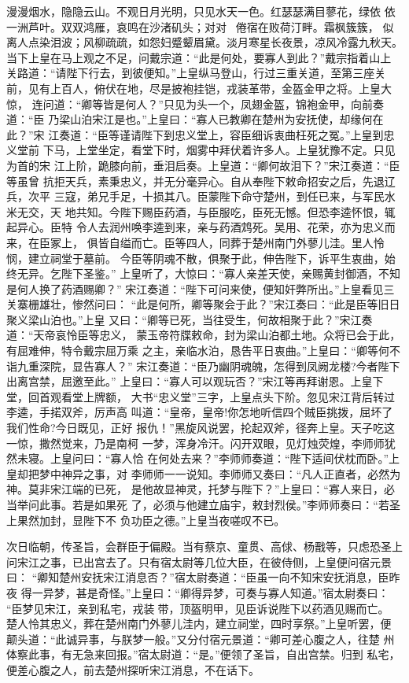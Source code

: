 漫漫烟水，隐隐云山。不观日月光明，只见水天一色。红瑟瑟满目蓼花，绿依
依一洲芦叶。双双鸿雁，哀鸣在沙渚矶头；对对，倦宿在败荷汀畔。霜枫簇簇，
似离人点染泪波；风柳疏疏，如怨妇蹙颦眉黛。淡月寒星长夜景，凉风冷露九秋天。
当下上皇在马上观之不足，问戴宗道：“此是何处，要寡人到此？”戴宗指着山上
关路道：“请陛下行去，到彼便知。”上皇纵马登山，行过三重关道，至第三座关
前，见有上百人，俯伏在地，尽是披袍挂铠，戎装革带，金盔金甲之将。上皇大惊，
连问道：“卿等皆是何人？”只见为头一个，凤翅金盔，锦袍金甲，向前奏道：“臣
乃梁山泊宋江是也。”上皇曰：“寡人已教卿在楚州为安抚使，却缘何在此？”宋
江奏道：“臣等谨请陛下到忠义堂上，容臣细诉衷曲枉死之冤。”上皇到忠义堂前
下马，上堂坐定，看堂下时，烟雾中拜伏着许多人。上皇犹豫不定。只见为首的宋
江上阶，跪膝向前，垂泪启奏。上皇道：“卿何故泪下？”宋江奏道：“臣等虽曾
抗拒天兵，素秉忠义，并无分毫异心。自从奉陛下敕命招安之后，先退辽兵，次平
三寇，弟兄手足，十损其八。臣蒙陛下命守楚州，到任已来，与军民水米无交，天
地共知。今陛下赐臣药酒，与臣服吃，臣死无憾。但恐李逵怀恨，辄起异心。臣特
令人去润州唤李逵到来，亲与药酒鸩死。吴用、花荣，亦为忠义而来，在臣冢上，
俱皆自缢而亡。臣等四人，同葬于楚州南门外蓼儿洼。里人怜悯，建立祠堂于墓前。
今臣等阴魂不散，俱聚于此，伸告陛下，诉平生衷曲，始终无异。乞陛下圣鉴。”
上皇听了，大惊曰：“寡人亲差天使，亲赐黄封御酒，不知是何人换了药酒赐卿？”
宋江奏道：“陛下可问来使，便知奸弊所出。”上皇看见三关寨栅雄壮，惨然问曰：
“此是何所，卿等聚会于此？”宋江奏曰：“此是臣等旧日聚义梁山泊也。”上皇
又曰：“卿等已死，当往受生，何故相聚于此？”宋江奏道：“天帝哀怜臣等忠义，
蒙玉帝符牒敕命，封为梁山泊都土地。众将已会于此，有屈难伸，特令戴宗屈万乘
之主，亲临水泊，恳告平日衷曲。”上皇曰：“卿等何不诣九重深院，显告寡人？”
宋江奏道：“臣乃幽阴魂魄，怎得到凤阙龙楼?今者陛下出离宫禁，屈邀至此。”
上皇曰：“寡人可以观玩否？”宋江等再拜谢恩。上皇下堂，回首观看堂上牌额，
大书“忠义堂”三字，上皇点头下阶。忽见宋江背后转过李逵，手掿双斧，厉声高
叫道：“皇帝，皇帝!你怎地听信四个贼臣挑拨，屈坏了我们性命?今日既见，正好
报仇！”黑旋风说罢，抡起双斧，径奔上皇。天子吃这一惊，撒然觉来，乃是南柯
一梦，浑身冷汗。闪开双眼，见灯烛荧煌，李师师犹然未寝。上皇问曰：“寡人恰
在何处去来？”李师师奏道：“陛下适间伏枕而卧。”上皇却把梦中神异之事，对
李师师一一说知。李师师又奏曰：“凡人正直者，必然为神。莫非宋江端的已死，
是他故显神灵，托梦与陛下？”上皇曰：“寡人来日，必当举问此事。若是如果死
了，必须与他建立庙宇，敕封烈侯。”李师师奏曰：“若圣上果然加封，显陛下不
负功臣之德。”上皇当夜嗟叹不已。

次日临朝，传圣旨，会群臣于偏殿。当有蔡京、童贯、高俅、杨戬等，只虑恐圣上
问宋江之事，已出宫去了。只有宿太尉等几位大臣，在彼侍侧，上皇便问宿元景曰：
“卿知楚州安抚宋江消息否？”宿太尉奏道：“臣虽一向不知宋安抚消息，臣昨夜
得一异梦，甚是奇怪。”上皇曰：“卿得异梦，可奏与寡人知道。”宿太尉奏曰：
“臣梦见宋江，亲到私宅，戎装带，顶盔明甲，见臣诉说陛下以药酒见赐而亡。
楚人怜其忠义，葬在楚州南门外蓼儿洼内，建立祠堂，四时享祭。”上皇听罢，便
颠头道：“此诚异事，与朕梦一般。”又分付宿元景道：“卿可差心腹之人，往楚
州体察此事，有无急来回报。”宿太尉道：“是。”便领了圣旨，自出宫禁。归到
私宅，便差心腹之人，前去楚州探听宋江消息，不在话下。

